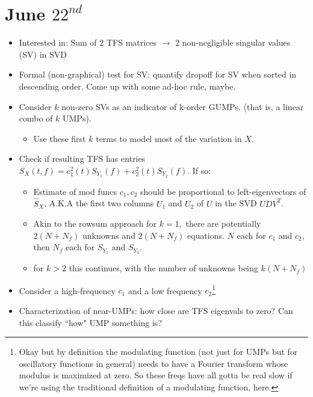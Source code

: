 \documentclass{article}
\begin{document}
\section*{June $22^{nd}$}
\begin{itemize}
    \item Interested in: Sum of 2 TFS matrices $\to$ 2 non-negligible singular  
        values (SV) in SVD
    \item Formal (non-graphical) test for SV: quantify dropoff for SV when sorted   
        in descending order. Come up with some ad-hoc rule, maybe.
    \item Consider $k$ non-zero SVs as an indicator of k-order GUMPs. (that is, a 
        linear combo of $k$ UMPs).
    \begin{itemize}
        \item Use these first $k$ terms to model most of the variation in $X$.
    \end{itemize}
    \item Check if resulting TFS has entries $S_X(t,f) = c_1^2(t)S_{Y_1}(f) + c_2^2(t)S_{Y_2}(f)$. If so:
    \begin{itemize}
        \item Estimate of mod funcs $c_1, c_2$ should be proportional to left-eigenvectors of $\hat S_X$, A.K.A the first two columns $U_1$ and $U_2$ of $U$ in the SVD $UDV^T$.
        \item Akin to the rowsum approach for $k=1,$ there are potentially $2(N+N_f)$ unknowns and $2(N+N_f)$ equations. $N$ each for $c_1$ and $c_2$, then $N_f$ each for $S_{Y_1}$ and $S_{Y_2}$.
        \item for $k>2$ this continues, with the number of unknowns being $k(N+N_f)$
    \end{itemize}
    \item Consider a high-frequency $c_1$ and a low frequency $c_2$\footnote{Okay but by definition the modulating function (not just for UMPs but for oscillatory functions in general) needs to have a Fourier transform whose modulus is maximized at zero. So these freqs have all gotta be real slow if we're using the traditional definition of a modulating function, here.}
    \item Characterization of near-UMPs: how close are TFS eigenvals to zero? Can this classify ``how" UMP something is?
\end{itemize}
\end{document}
